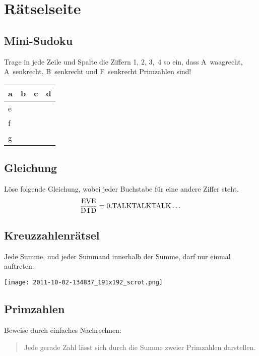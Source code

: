 ﻿\chapter{Rätselseite}

\raggedcolumns
\begin{multicols}{2}
	\section*{Mini-Sudoku}
	Trage in jede Zeile und Spalte die Ziffern 1, 2, 3,~4 so ein, dass A~waagrecht, A~senkrecht, B~senkrecht und F~senkrecht Primzahlen sind!

	\begin{center}
		\begin{tabular}{ |p{0.8cm}|p{0.8cm}|p{0.8cm}|p{0.8cm}| }
		\hline
		  a & b & c & d \\[0.8cm]
		\hline
		  e &   &   &   \\[0.8cm]
		\hline
		  f &   &   &   \\[0.8cm]
		\hline
		  g &   &   &   \\[0.8cm]
		\hline
		\end{tabular}
	\end{center}

	\section*{Gleichung}
	Löse folgende Gleichung, wobei jeder Buchstabe für eine andere Ziffer steht.
	\[\frac{\textrm{EVE}}{\textrm{D\,I\,D}} = \textrm{0,TALKTALKTALK}\dots\]

		\columnbreak
		\columnbreak
	\section*{Kreuzzahlenrätsel}
	Jede Summe, und jeder Summand innerhalb der Summe, darf nur einmal auftreten.

	\texttt{[image: 2011-10-02-134837\_191x192\_scrot.png]}

	\section*{Primzahlen}
	Beweise durch einfaches Nachrechnen:
	\begin{quote}
		Jede gerade Zahl lässt sich durch die Summe zweier Primzahlen darstellen.
	\end{quote}

	\end{multicols}

